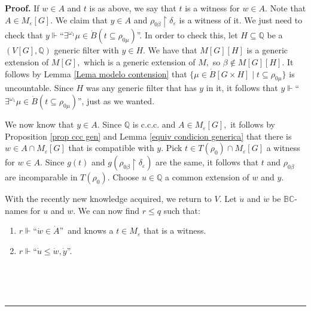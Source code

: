 \documentclass{article}
\newenvironment{proof}[1][Proof]{\noindent\textbf{#1.} }{\ \rule{0.5em}{0.5em}}
\begin{document}
\begin{proof}
If $w\in A$ and $t$ is as above, we say that $t$ is a witness for $w\in A.$
Note that $A\in M_{\varepsilon}\left[  G\right]  .$ We claim that $y\in A$ and
$\rho_{0\beta}\upharpoonright\delta_{\varepsilon}$ is a witness of it. We just
need to check that $y\Vdash$\textquotedblleft$\exists^{\omega_{1}}\mu\in
\dot{B}\left(  t\subseteq\rho_{0\mu}\right)  $\textquotedblright. In order to
check this, let $H\subseteq\mathbb{Q}$ be a $\left(  V\left[  G\right]
,\mathbb{Q}\right)  $ generic filter with $y\in H.$ We have that $M\left[
G\right]  \left[  H\right]  $ is a generic extension of $M\left[  G\right]  ,$
which is a generic extension of $M,$ so $\beta\notin M\left[  G\right]
\left[  H\right]  .$ It follows by Lemma \ref{Lema modelo contension} that
$\{\mu\in\dot{B}\left[  G\times H\right]  \mid t\subseteq\rho_{0\mu}\}$ is
uncountable. Since $H$ was any generic filter that has $y$ in it, it follows
that $y\Vdash$\textquotedblleft$\exists^{\omega_{1}}\mu\in\dot{B}\left(
t\subseteq\rho_{0\mu}\right)  $\textquotedblright, just as we wanted.

\qquad\qquad\qquad

We now know that $y\in A.$ Since $\mathbb{Q}$ is \textsf{c.c.c. }and $A\in
M_{\varepsilon}\left[  G\right]  ,$ it follows by Proposition
\ref{prop ccc gen} and Lemma \ref{equiv condicion generica} that there is
$w\in A\cap M_{\varepsilon}\left[  G\right]  $ that is compatible with $y.$
Pick $t\in T\left(  \rho_{0}\right)  \cap M_{\varepsilon}\left[  G\right]  $ a
witness for $w\in A.$ Since $g\left(  t\right)  $ and $g\left(  \rho_{0\beta
}\upharpoonright\delta_{\varepsilon}\right)  $ are the same, it follows that
$t$ and $\rho_{0\beta}$ are incomparable in $T\left(  \rho_{0}\right)  .$
Choose $u\in\mathbb{Q}$ a common extension of $w$ and $y.$

\qquad\qquad\qquad\qquad

With the recently new knowledge acquired, we return to $V.$ Let $\dot{u}$ and
$\dot{w}$ be $\mathbb{BC}$-names for $u$ and $w.$ We can now find $r\leq q$
such that:

\begin{enumerate}
\item $r\Vdash$\textquotedblleft$\dot{w}\in\dot{A}$\textquotedblright\ and
knows a $t\in M_{\varepsilon}$ that is a witness.

\item $r\Vdash$\textquotedblleft$\dot{u}\leq\dot{w},\dot{y}$\textquotedblright.
\end{enumerate}

\qquad\ \ \ 


\end{proof}
\end{document}
